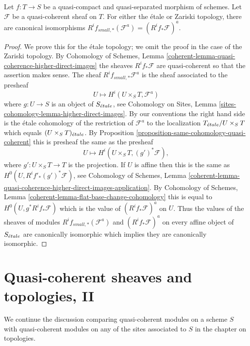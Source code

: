 \begin{lemma}
\label{lemma-higher-direct-images-small-etale}
Let $f : T \to S$ be a quasi-compact and quasi-separated morphism of schemes.
Let $\mathcal{F}$ be a quasi-coherent sheaf on $T$. For either the \'etale
or Zariski topology, there are canonical isomorphisms
$R^if_{small, *}(\mathcal{F}^a) = (R^if_*\mathcal{F})^a$.
\end{lemma}

\begin{proof}
We prove this for the \'etale topology; we omit the proof in the case
of the Zariski topology. By Cohomology of Schemes, Lemma
\ref{coherent-lemma-quasi-coherence-higher-direct-images}
the sheaves $R^if_*\mathcal{F}$ are quasi-coherent so that the assertion
makes sense. The sheaf $R^if_{small, *}\mathcal{F}^a$ is the sheaf associated
to the presheaf
$$
U \longmapsto H^i(U \times_S T, \mathcal{F}^a)
$$
where $g : U \to S$ is an object of $S_{\acute{e}tale}$, see
Cohomology on Sites, Lemma \ref{sites-cohomology-lemma-higher-direct-images}.
By our conventions the right hand side is the \'etale
cohomology of the restriction of $\mathcal{F}^a$ to the localization
$T_{\acute{e}tale}/U \times_S T$ which equals
$(U \times_S T)_{\acute{e}tale}$. By
Proposition \ref{proposition-same-cohomology-quasi-coherent}
this is presheaf the same as the presheaf
$$
U \longmapsto
H^i(U \times_S T, (g')^*\mathcal{F}),
$$
where $g' : U \times_S T \to T$ is the projection. If $U$ is affine
then this is the same as $H^0(U, R^if'_*(g')^*\mathcal{F})$, see
Cohomology of Schemes, Lemma
\ref{coherent-lemma-quasi-coherence-higher-direct-images-application}.
By
Cohomology of Schemes, Lemma \ref{coherent-lemma-flat-base-change-cohomology}
this is equal to $H^0(U, g^*R^if_*\mathcal{F})$ which is the value
of $(R^if_*\mathcal{F})^a$ on $U$.
Thus the values of the sheaves of modules
$R^if_{small, *}(\mathcal{F}^a)$ and $(R^if_*\mathcal{F})^a$
on every affine object of $S_{\acute{e}tale}$ are canonically isomorphic
which implies they are canonically isomorphic.
\end{proof}




\section{Quasi-coherent sheaves and topologies, II}
\label{section-quasi-coherent-sheaves-bis}

\noindent
We continue the discussion comparing quasi-coherent modules on a scheme $S$
with quasi-coherent modules on any of the sites associated to $S$
in the chapter on topologies.


